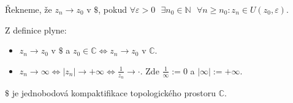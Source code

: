 \begin{definition}
Řekneme, že $z_n\rightarrow z_0$ v $\$$, pokud $\forall\varepsilon>0\textbf{ }  \exists n_0\in\mathbb{N}\textbf{ }\forall n\geq n_0:z_n\in U(z_0,\varepsilon)$.
\end{definition}

\begin{note} Z definice plyne:
\begin{itemize}
    \item $z_n\rightarrow z_0$ v $\$$ a $z_0\in\mathbb{C}\Leftrightarrow z_n\rightarrow z_0$ v $\mathbb{C}$.
    \item $z_n\rightarrow\infty\Leftrightarrow|z_n|\rightarrow+\infty\Leftrightarrow\frac{1}{z_n}\rightarrow\cdot$. Zde $\frac{1}{\infty}:=0$ a $|\infty|:=+\infty$.
\end{itemize}
\end{note}

\begin{note}
$\$$ je jednobodová kompaktifikace topologického prostoru $\mathbb{C}$.
\end{note}

